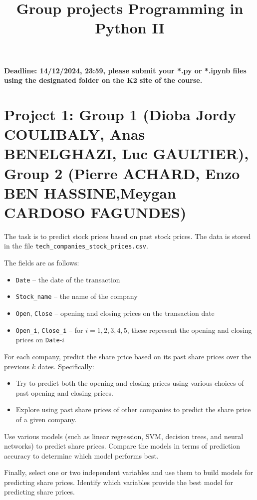 \documentclass{article}
\title{Group projects Programming in Python II}
\author{}
\date{}
\begin{document}
\maketitle

\textbf{Deadline: 14/12/2024, 23:59,  please submit your *.py or *.ipynb files using the designated folder on the K2 site of the course.}



\section*{Project 1: Group 1 (Dioba Jordy COULIBALY, Anas BENELGHAZI, Luc GAULTIER), Group 2  (Pierre ACHARD, Enzo BEN HASSINE,Meygan CARDOSO FAGUNDES) }
The task is to predict stock prices based on past stock prices. The data is stored in the file \lstinline$tech_companies_stock_prices.csv$.

The fields are as follows:
\begin{itemize} \item \lstinline$Date$ -- the date of the transaction 
\item \lstinline$Stock_name$ -- the name of the company 
\item \lstinline$Open$, \lstinline$Close$ -- opening and closing prices on the transaction date 
\item \lstinline$Open_i$, \lstinline$Close_i$ -- for $i=1,2,3,4,5$, these represent the opening and closing prices on \lstinline$Date$-$i$ 
\end{itemize}

For each company, predict the share price based on its past share prices over the previous $k$ dates. Specifically: 
\begin{itemize} 
\item Try to predict both the opening and closing prices using various choices of past opening and closing prices. 
\item Explore using past share prices of other companies to predict the share price of a given company. 
\end{itemize}

Use various models (such as linear regression, SVM, decision trees, and neural networks) to predict share prices. Compare the models in terms of prediction accuracy to determine which model performs best.

Finally, select one or two independent variables and use them to build models for predicting share prices. Identify which variables provide the best model for predicting share prices.
\end{document}
